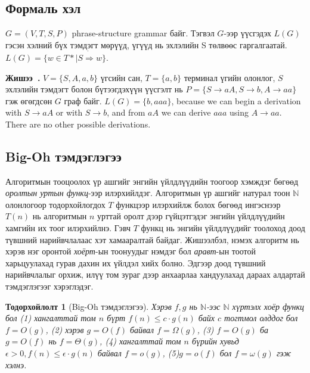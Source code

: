 \documentclass{article}
\newcounter{example}[section]
\newenvironment{example}[1][]{\refstepcounter{example}\par\medskip
   \noindent \textbf{Жишээ~\theexample. #1} \rmfamily}{\medskip}
\newtheorem{definition}{Тодорхойлолт}[section]
\begin{document}
\subsection{Формаль хэл}

$G =(V, T, S, P)$ phrase-structure grammar байг. Тэгвэл $G$-ээр үүсгэдэх $L(G)$ гэсэн хэлний бүх тэмдэгт мөрүүд, үгүүд нь эхлэлийн S төлвөөс гаргалгаатай.
$L(G) = \{w \in T* \mid S  \dot{\Rightarrow} w\}$.

\begin{example}
$V = \{S, A, a, b\}$ үгсийн сан, $T = \{a, b\}$ терминал үгийн олонлог, $S$ эхлэлийн тэмдэгт болон бүтээгдэхүүн үүсгэлт нь $P = \{S \rightarrow aA, S \rightarrow b, A \rightarrow aa \}$ гэж өгөгдсөн $G$ граф байг.
$L(G) = \{b, aaa\}$, because we can begin a derivation with $S \rightarrow aA$ or with $S \rightarrow b$, and  from $aA$ we can derive $aaa$ using  $A \rightarrow aa$. There are no other possible derivations.
\end{example}

\subsection{Big-Oh тэмдэглэгээ}
Алгоритмын тооцоолох үр ашгийг энгийн үйлдлүүдийн тоогоор хэмждэг бөгөөд \textit{оролтын уртын функц}-ээр илэрхийлдэг. Алгоритмын үр ашгийг натурал тоон $\mathbb{N}$ олонлогоор тодорхойлогдох $T$ функцээр илэрхийлж болох бөгөөд ингэснээр $T(n)$ нь алгоритмын $n$ урттай оролт дээр гүйцэтгэдэг энгийн үйлдлүүдийн хамгийн их тоог илэрхийлнэ. Гэвч $T$ функц нь энгийн үйлдлүүдийг тоолоход доод түвшний нарийвчлалаас хэт хамааралтай байдаг. Жишээлбэл, нэмэх алгоритм нь хэрэв нэг оронтой \textit{хоёрт}-ын тоонуудыг нэмдэг бол \textit{аравт}-ын тоотой харьцуулахад гурав дахин их үйлдэл хийх болно. Эдгээр доод түвшний нарийвчлалыг орхиж, илүү том зураг дээр анхаарлаа хандуулахад дараах алдартай тэмдэглэгээг хэрэглэдэг.

\begin{definition}[Big-Oh тэмдэглэгээ]
Хэрэв $f, g$ нь $\mathbb{N}$-ээс $\mathbb{N}$ хүртэлх хоёр функц бол (1) хангалттай том $n$ бүрт $f (n) \leq c \cdot g(n)$ байх $c$ тогтмол олддог бол $f = O(g)$, (2) хэрэв $g = O(f)$ байвал $f = \Omega(g)$, (3) $f = O(g)$ ба $g = O(f)$ нь $f = \Theta(g)$, (4) хангалттай том $n$ бүрийн хувьд $\epsilon> 0, f(n)\leq\epsilon\cdot g(n)$ байвал $f=o(g)$, (5)$g=o(f)$ бол $f=\omega(g)$ гэж хэлнэ.
\end{definition}
\end{document}
